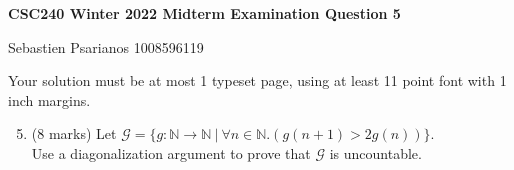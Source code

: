 \documentclass[11pt]{article}
\def\nats{{\mathbb N}}
\def\setG{{\mathscr{G}}}
\begin{document}
\begin{center}
{\bf \Large \bf CSC240 Winter 2022 Midterm Examination Question 5}\\
\end{center}
\begin{solution}
    Sebastien Psarianos 1008596119
\end{solution}

\begin{question}
Your solution must be at most 1 typeset page, using at least 11 point font with 1 inch margins.
\end{question}


\begin{enumerate}
\setcounter{enumi}{4}
\item
\begin{question}
(8 marks)
Let  $\setG = \{ g:\nats \rightarrow \nats \ |\ \forall n \in \nats.(g(n+1) > 2{g(n)})\}$.\\
Use a diagonalization argument to prove that $\setG$ is uncountable.
\end{question}


\end{enumerate}
\end{document}
